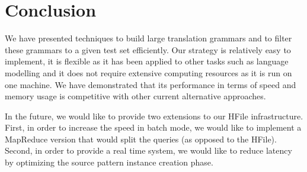 \section{Conclusion}
\label{sec:conclusion}

We have presented techniques to build large translation
grammars and to filter these grammars to a given test set efficiently.
Our strategy is relatively easy to implement, it is
flexible as it has been applied to other tasks such as language modelling
and it does not require extensive computing resources as it is run on one
machine. We have demonstrated that its performance in terms of speed and memory
usage is competitive with other current alternative approaches.

In the future, we would like to provide two extensions to our HFile
infrastructure. First, in order to increase the speed in batch mode, we would
like to implement a MapReduce version that would split the queries (as opposed
to the HFile). Second, in order to provide a real time system, we would like to
reduce latency by optimizing the source pattern instance creation phase.
